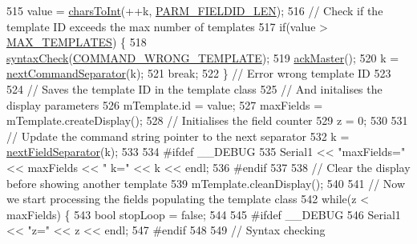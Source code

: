 \begin{DoxyCode}
\begin{DoxyCode}
\begin{DoxyCode}
\begin{DoxyCode}
515             value = \hyperlink{_meditech___chip_kit_control_panel_8pde_ad893e606e19944faa6540bba9387370f}{charsToInt}(++k, \hyperlink{_command_processor_8h_a01ff82405086f08d2af53956b5247a30}{PARM\_FIELDID\_LEN});
516             \textcolor{comment}{// Check if the template ID exceeds the max number of templates}
517             \textcolor{keywordflow}{if}(value > \hyperlink{_l_c_d_templates_8h_a0b935b9f5a6d3f57285fece1aa0a37a5}{MAX\_TEMPLATES}) \{
518               \hyperlink{_meditech___chip_kit_control_panel_8pde_a586164a6eff90eab6ba87a6ca123770d}{syntaxCheck}(\hyperlink{_parser_errors_8h_a5a9f152004095e86df06f3ac426d26fc}{COMMAND\_WRONG\_TEMPLATE});
519               \hyperlink{_meditech___chip_kit_control_panel_8pde_a4e435af9ec30d668c4cff6a97baa8e5a}{ackMaster}();
520               k = \hyperlink{_meditech___chip_kit_control_panel_8pde_a4b62bbf3dd6cf7eb7fee557932fd1b7c}{nextCommandSeparator}(k);
521               \textcolor{keywordflow}{break};
522             \} \textcolor{comment}{// Error wrong template ID}
523             
524             \textcolor{comment}{// Saves the template ID in the template class}
525             \textcolor{comment}{// And initalises the display parameters}
526             mTemplate.id = value;
527             maxFields = mTemplate.createDisplay();
528             \textcolor{comment}{// Initialises the field counter}
529             z = 0;
530 
531             \textcolor{comment}{// Update the command string pointer to the next separator}
532             k = \hyperlink{_meditech___chip_kit_control_panel_8pde_a6b0edf09b0e4b4ed48c9213d14d27efa}{nextFieldSeparator}(k); 
533 
534 \textcolor{preprocessor}{            #ifdef \_\_DEBUG}
535 \textcolor{preprocessor}{}            Serial1 << \textcolor{stringliteral}{"maxFields="} << maxFields << \textcolor{stringliteral}{" k="} << k << endl;
536 \textcolor{preprocessor}{            #endif}
537 \textcolor{preprocessor}{}            
538             \textcolor{comment}{// Clear the display before showing another template}
539             mTemplate.cleanDisplay();
540             
541             \textcolor{comment}{// Now we start processing the fields populating the template class}
542             \textcolor{keywordflow}{while}(z < maxFields) \{
543               \textcolor{keywordtype}{bool} stopLoop = \textcolor{keyword}{false};
544 
545 \textcolor{preprocessor}{              #ifdef \_\_DEBUG}
546 \textcolor{preprocessor}{}              Serial1 << \textcolor{stringliteral}{"z="} << z << endl;
547 \textcolor{preprocessor}{              #endif}
548 \textcolor{preprocessor}{}
549               \textcolor{comment}{// Syntax checking}

\end{DoxyCode}
\end{DoxyCode}
\end{DoxyCode}
\end{DoxyCode}

